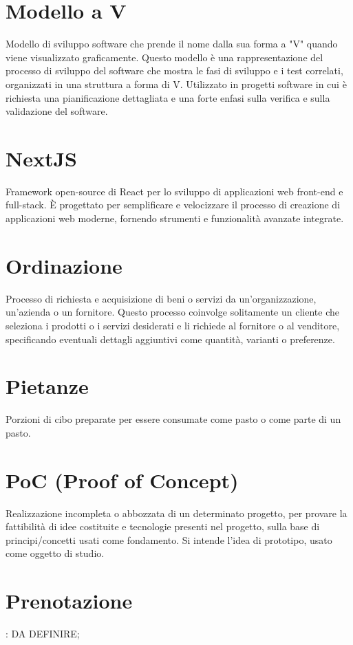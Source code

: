 \section{Modello a V}
Modello di sviluppo software che prende il nome dalla sua forma a "V" quando viene visualizzato graficamente. Questo modello è una rappresentazione del processo di sviluppo del software che mostra le fasi di sviluppo e i test correlati, organizzati in una struttura a forma di V. Utilizzato in progetti software in cui è richiesta una pianificazione dettagliata e una forte enfasi sulla verifica e sulla validazione del software.

\section{NextJS}
Framework open-source di React per lo sviluppo di applicazioni web front-end e full-stack. È progettato per semplificare e velocizzare il processo di creazione di applicazioni web moderne, fornendo strumenti e funzionalità avanzate integrate.

\section{Ordinazione}
Processo di richiesta e acquisizione di beni o servizi da un'organizzazione, un'azienda o un fornitore. Questo processo coinvolge solitamente un cliente che seleziona i prodotti o i servizi desiderati e li richiede al fornitore o al venditore, specificando eventuali dettagli aggiuntivi come quantità, varianti o preferenze.

\section{Pietanze}
Porzioni di cibo preparate per essere consumate come pasto o come parte di un pasto.

\section{PoC (Proof of Concept)}
Realizzazione incompleta o abbozzata di un determinato progetto, per provare la fattibilità di idee costituite e tecnologie presenti nel progetto, sulla base di principi/concetti usati come fondamento. Si intende l’idea di prototipo, usato come oggetto di studio.

\section{Prenotazione}: DA DEFINIRE;
